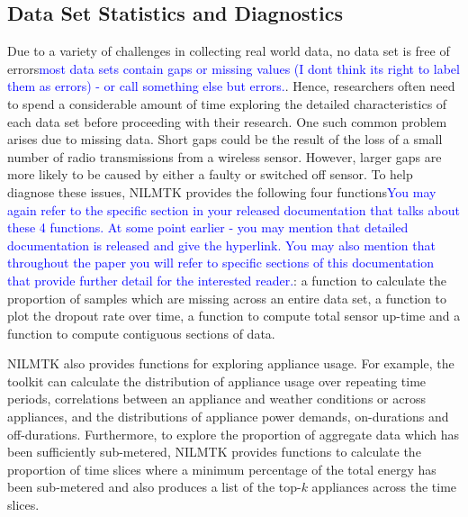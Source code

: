 \documentclass{sig-alternate}
\newcommand{\bluecolor}[1]{\textcolor{blue}{#1}}
\begin{document}
\subsection{Data Set Statistics and Diagnostics}

\noindent
Due to a variety of challenges in collecting real world data, no data set is free of errors\bluecolor{most data sets contain gaps or missing values (I dont think its right to label them as errors) - or call something else but errors.}. Hence, researchers often need to spend a considerable amount of time exploring the detailed characteristics of each data set before proceeding with their research. One such common problem arises due to missing data.  Short gaps could be the result of 
the loss of a small number of radio transmissions from a wireless sensor. However, larger gaps are more likely to be caused by either a faulty or switched off sensor.
To help diagnose these issues, NILMTK provides the following four functions\bluecolor{You may again refer to the specific section in your released documentation that talks about these 4 functions. 
At some point earlier - you may mention that detailed documentation is released and give the hyperlink. You may also mention that throughout the paper you will refer to specific sections of this documentation that provide further detail for the interested reader.}: a function to calculate the proportion of samples which are missing across an entire data set, %
a function to plot the dropout rate over time, a function to compute total sensor up-time and a function to compute contiguous sections of data. %

NILMTK also provides functions for exploring appliance usage.  For example, the toolkit can calculate the distribution of appliance usage over repeating time periods, correlations between an appliance and weather conditions or across appliances, and the distributions of appliance power demands, on-durations and off-durations.  Furthermore, to explore the proportion of aggregate data which has been sufficiently sub-metered, NILMTK provides functions to calculate the proportion of time slices where a minimum percentage of the total energy has been sub-metered and also produces a list of the top-$k$ appliances across the time slices.
\end{document}

